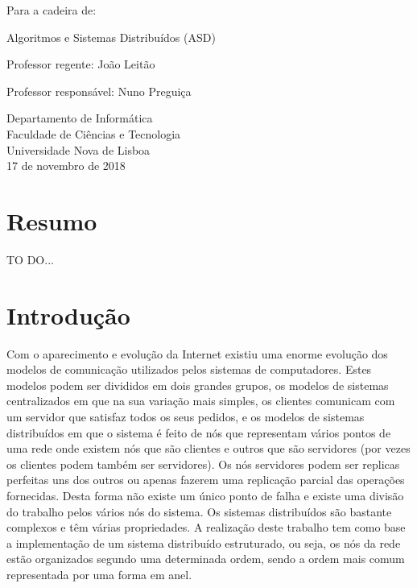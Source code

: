 \documentclass[12pt]{article}
\begin{document}
\begin{titlepage}
\begin{center}
        \vspace{0.5cm}
        
        Para a cadeira de:
        
        Algoritmos e Sistemas Distribuídos (ASD)
        
        \vspace{0.5cm}

		Professor regente: 
		João Leitão
		
		Professor responsável:
		Nuno Preguiça
		
        \vspace{0.5cm}
                
        Departamento de Informática\\
        Faculdade de Ciências e Tecnologia\\
        Universidade Nova de Lisboa\\
        17 de novembro de 2018
    \end{center}
\end{titlepage}

\newpage
\tableofcontents

\newpage
\listoffigures

\newpage
\listoftables

\newpage
\section{Resumo}

TO DO...

\newpage
\section{Introdução}

Com o aparecimento e evolução da Internet existiu uma enorme evolução dos modelos de comunicação utilizados pelos sistemas de computadores. Estes modelos podem ser divididos em dois grandes grupos, os modelos de sistemas centralizados em que na sua variação mais simples, os clientes comunicam com um servidor que satisfaz todos os seus pedidos, e os modelos de sistemas distribuídos em que o sistema é feito de nós que representam vários pontos de uma rede onde existem nós que são clientes e outros que são servidores (por vezes os clientes podem também ser servidores). Os nós servidores podem ser replicas perfeitas uns dos outros ou apenas fazerem uma replicação parcial das operações fornecidas. Desta forma não existe um único ponto de falha e existe uma divisão do trabalho pelos vários nós do sistema. Os sistemas distribuídos são bastante complexos e têm várias propriedades. A realização deste trabalho tem como base a implementação de um sistema distribuído estruturado, ou seja, os nós da rede estão organizados segundo uma determinada ordem, sendo a ordem mais comum representada por uma forma em anel.
\end{document}
